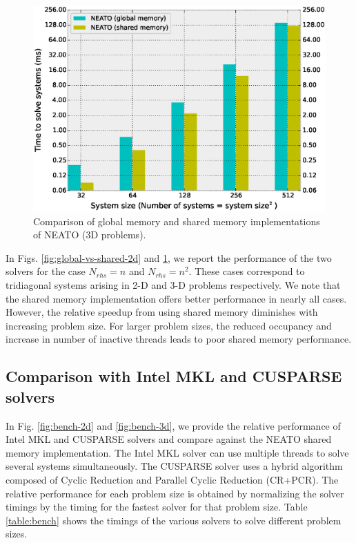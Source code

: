 \documentclass{elsarticle}
\begin{document}
\begin{figure}[h!]
\begin{center}
\includegraphics[width=1.0\linewidth]{fig/global-vs-shared-3d.eps}
\caption{Comparison of global memory and shared memory
    implementations of NEATO (3D problems).}
\label{fig:global-vs-shared-3d}
\end{center}
\end{figure}

In Figs. \ref{fig:global-vs-shared-2d} and \ref{fig:global-vs-shared-3d},
we report the performance of the two solvers for the case
$N_{rhs} = n$ and $N_{rhs} = n^2$.
These cases correspond to tridiagonal systems
arising in 2-D and 3-D problems respectively.
We note that the shared memory implementation
offers better performance in nearly all cases.
However, the relative speedup from using
shared memory diminishes with increasing problem size.
For larger problem sizes,
the reduced occupancy and increase in number of inactive threads
leads to poor shared memory performance.

\subsection{Comparison with Intel MKL and CUSPARSE solvers}

In Fig. \ref{fig:bench-2d} and \ref{fig:bench-3d},
we provide the relative performance of
Intel MKL and CUSPARSE solvers and compare against
the NEATO shared memory implementation.
The Intel MKL solver can use multiple threads
to solve several systems simultaneously.
The CUSPARSE solver uses a hybrid algorithm composed
of Cyclic Reduction and Parallel Cyclic Reduction (CR+PCR).
The relative performance for
each problem size is obtained by
normalizing the solver timings
by the timing for the fastest solver for that problem size.
Table \ref{table:bench} shows the timings of the various
solvers to solve different problem sizes.
\end{document}
